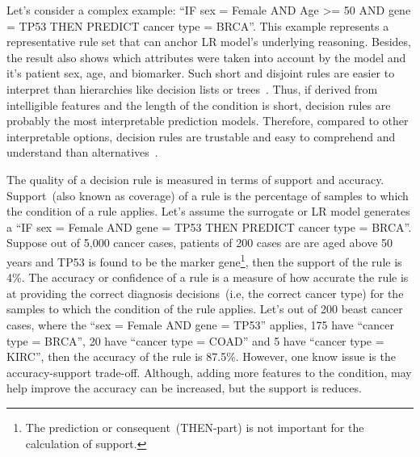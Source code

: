 \hspace*{3.5mm} Let's consider a complex example: ``IF sex = Female AND Age >= 50 AND gene = TP53 THEN PREDICT cancer type = BRCA''. This example represents a representative rule set that can anchor LR model's underlying reasoning. Besides, the result also shows which attributes were taken into account by the model and it's patient sex, age, and biomarker. Such short and disjoint rules are easier to interpret than hierarchies like decision lists or trees~\cite{ming2018rulematrix}.
Thus, if derived from intelligible features and the length of the condition is short, decision rules are probably the most interpretable prediction models. Therefore, compared to other interpretable options, decision rules are trustable and easy to comprehend and understand than alternatives~\cite{ribeiro2018anchors}. 

\hspace*{3.5mm} The quality of a decision rule is measured in terms of support and accuracy. Support~(also known as coverage) of a rule is the percentage of samples to which the condition of a rule applies. Let's assume the surrogate or LR model generates a ``IF sex = Female AND gene = TP53 THEN PREDICT cancer type = BRCA''. Suppose out of 5,000 cancer cases, patients of 200 cases are are aged above 50 years and TP53 is found to be the marker gene\footnote{The prediction or consequent~(THEN-part) is not important for the calculation of support.}, then the support of the rule is 4\%. 
The accuracy or confidence of a rule is a measure of how accurate the rule is at providing the correct diagnosis decisions~(i.e, the correct cancer type) for the samples to which the condition of the rule applies. Let's out of 200 beast cancer cases, where the ``sex = Female AND gene = TP53'' applies, 175 have ``cancer type = BRCA'', 20 have ``cancer type = COAD'' and 5 have ``cancer type = KIRC'', then the accuracy of the rule is 87.5\%. 
However, one know issue is the accuracy-support trade-off. Although, adding more features to the condition, may help improve the accuracy can be increased, but the support is reduces.

